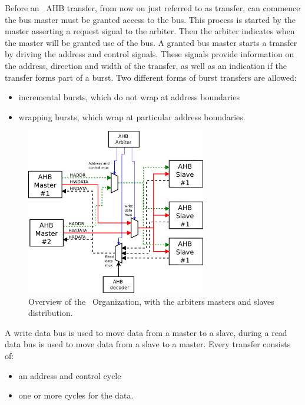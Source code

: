 Before an \amba~AHB transfer, from now on just referred to as transfer, can commence the bus master must be granted access to the bus. This process is started by the master asserting a request signal to the arbiter. Then the arbiter indicates when the master will be granted use of the bus. A granted bus master starts a transfer by driving the address and control signals. These signals provide information on the address, direction and width of the transfer, as well as an indication if the transfer forms part of a burst. Two different forms of burst transfers are allowed:
\begin{itemize}
\item incremental bursts, which do not wrap at address boundaries
\item wrapping bursts, which wrap at particular address boundaries.
\end{itemize}
\begin{figure}[!ht]
    \centering
    \includegraphics[width=0.7\textwidth]{figures/pdf/amba2_arbiter.pdf}
    \caption{Overview  of the \amba~Organization, with the arbiters masters and slaves distribution.}
    \label{fig:internorg}
\end{figure}

A write data bus is used to move data from a master to a slave, during a read data bus
is used to move data from a slave to a master.
Every transfer consists of:

\begin{itemize}
\item an address and control cycle
\item one or more cycles for the data.
\end{itemize}



